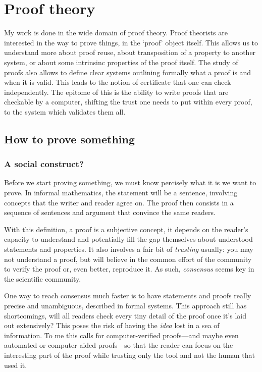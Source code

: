 \chapter{Proof theory}

My work is done in the wide domain of proof theory. Proof theorists are
interested in the way to prove things, in the `proof' object itself.
This allows us to understand more about proof reuse, about transposition of a
property to another system, or about some intrinsinc properties of the proof
itself. The study of proofs also allows to define clear systems outlining
formally what a proof is and when it is valid. This leads to the notion of
certificate that one can check independently. The epitome of this is the ability
to write proofs that are checkable by a computer, shifting the trust one needs
to put within every proof, to the system which validates them all.

\section{How to prove something}

\subsection{A social construct?}

Before we start proving something, we must know percisely what it is we want to
prove. In informal mathematics, the statement will be a sentence, involving
concepts that the writer and reader agree on. The proof then consists in a
sequence of sentences and argument that convince the same readers.

With this definition, a proof is a subjective concept, it depends on the
reader's capacity to understand and potentially fill the gap themselves about
understood statements and properties. It also involves a fair bit of
\emph{trusting} usually: you may not understand a proof, but will believe in
the common effort of the community to verify the proof or, even better,
reproduce it.
As such, \emph{consensus} seems key in the scientific community.

One way to reach consensus much faster is to have statements and proofs really
precise and unambiguous, described in formal systems. This approach still has
shortcomings, will all readers check every tiny detail of the proof once it's
laid out extensively? This poses the risk of having the \emph{idea} lost in a
sea of information.
To me this calls for computer-verified proofs---and maybe even automated or
computer aided proofs---so that the reader can focus on the interesting part of
the proof while trusting only the tool and not the human that used it.

